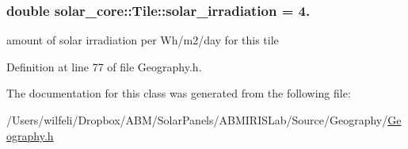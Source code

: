 \subsubsection[{solar\+\_\+irradiation}]{\setlength{\rightskip}{0pt plus 5cm}double solar\+\_\+core\+::\+Tile\+::solar\+\_\+irradiation = 4.}\label{classsolar__core_1_1_tile_a2062d4ffe05c6f6282975f71f2d24441}
amount of solar irradiation per Wh/m2/day for this tile 

Definition at line 77 of file Geography.\+h.



The documentation for this class was generated from the following file\+:\begin{DoxyCompactItemize}
\item 
/\+Users/wilfeli/\+Dropbox/\+A\+B\+M/\+Solar\+Panels/\+A\+B\+M\+I\+R\+I\+S\+Lab/\+Source/\+Geography/\hyperlink{_geography_8h}{Geography.\+h}\end{DoxyCompactItemize}
